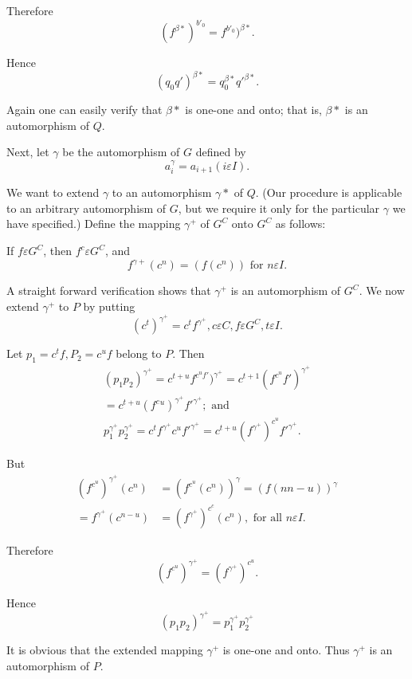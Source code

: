 Therefore
$$
(f^{\beta*})^{b'_0} = f^{b'_0})^{\beta*}.
$$

Hence 
$$
(q_0 q')^{\beta*} = q^{\beta*}_0 q'^{\beta*}.
$$

Again one can easily verify that ${\beta*}$ is one-one and onto; that
is, ${\beta*}$ is an automorphism of $Q$. 

Next, let $\gamma$ be the automorphism of $G$ defined by 
$$
a^{\gamma}_i = a_{i + 1} (i \varepsilon I).
$$

We want to extend $\gamma$ to an automorphism $\gamma*$ of $Q$. (Our
procedure is applicable to an arbitrary automorphism of $G$, but we
require it only for the particular $\gamma$ we have specified.) Define
the mapping $\gamma^+$ of $G^C$ onto $G^C$ as follows: 

If $f \varepsilon G^C$, then $f^{c} \varepsilon G^C$, and 
$$
f^{\gamma+} (c^n) = (f(c^n)) \text{ for } n \varepsilon I.
$$ 

A straight forward verification shows that $\gamma^+$ is an
automorphism of $G^C$. We now extend $\gamma^+$ to $P$ by putting  
$$
(c^t)^{\gamma^+} = c^t f^{\gamma^+}, c \varepsilon C, f \varepsilon
G^C, t \varepsilon I. 
$$

Let $p_1 = c^t f,  P_2 = c^u f$ belong to $P$. Then 
\begin{gather*}
  (p_1 p_2)^{\gamma ^{+}} = c^{t+u } f^{c^{u} f'})^{\gamma^{+} } =
  c^{t+1} (f^{c^{u}}f' )^{\gamma^{+}}\\ 
  = c^{t + u} (f^c{^u})^{\gamma^{+}} f'^{\gamma^{+}}; \text{ and }\\
  p_1^{\gamma ^{+}} p_2^{\gamma^{+}} = c^t f^{\gamma^{+}} c^u
  f'^{\gamma^{+}} = c^{t+u} (f^{\gamma^{+}})^{c^u} f'^{\gamma^{+}}. 
\end{gather*}

But
\begin{align*}
  (f^{c^u})^{\gamma^{+}} (c^n) & = (f^{c^{u}}(c^n))^{\gamma} = (f(n{n - u}))^{\gamma}\\
  = f^{\gamma^{+}} (c^{n-u}) & = (f^{\gamma^{+}})^{c^{c}} (c^n),
  \text{ for all } n \varepsilon I. 
\end{align*}

Therefore 
$$
(f^{c^{u}})^{\gamma^{+}} = (f^{\gamma^{+}})^{c^{u}}.
$$

Hence
$$
(p_1 p_2)^{\gamma^{+}}  = p_1^{\gamma^{+}} p_2^{\gamma^{+}}
$$

It is obvious that the extended mapping ${\gamma^{+}}$ is one-one and
onto. Thus ${\gamma^{+}}$ is an automorphism of $P$. 

